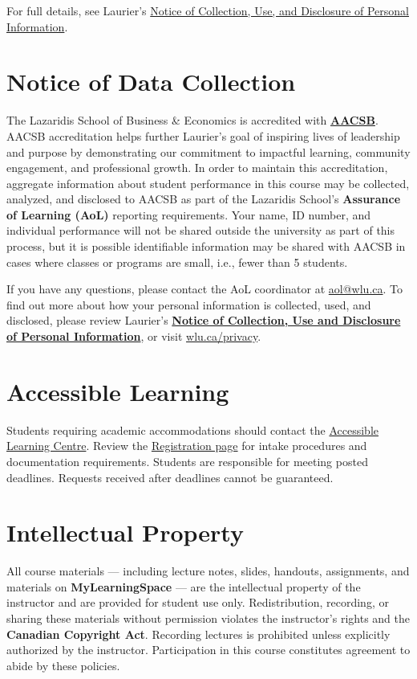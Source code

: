 \documentclass[11pt]{article}
\newcommand{\coloredsection}[1]{%
    \section*{\large\textcolor{sectioncolor}{#1}}%
}
\begin{document}
For full details, see Laurier’s  
\href{https://www.wlu.ca/privacy}{Notice of Collection, Use, and Disclosure of Personal Information}.

\coloredsection{Notice of Data Collection}

The Lazaridis School of Business \& Economics is accredited with 
\href{https://www.aacsb.edu/}{\textbf{AACSB}}. AACSB accreditation helps further Laurier’s goal of inspiring lives of leadership and purpose by demonstrating our commitment to impactful learning, community engagement, and professional growth. In order to maintain this accreditation, aggregate information about student performance in this course may be collected, analyzed, and disclosed to AACSB as part of the Lazaridis School's \textbf{Assurance of Learning (AoL)} reporting requirements. Your name, ID number, and individual performance will not be shared outside the university as part of this process, but it is possible identifiable information may be shared with AACSB in cases where classes or programs are small, i.e., fewer than 5 students.

If you have any questions, please contact the AoL coordinator at \href{mailto:aol@wlu.ca}{aol@wlu.ca}. To find out more about how your personal information is collected, used, and disclosed, please review Laurier’s 
\href{https://www.wlu.ca/about/public-accountability/privacy/notice-of-collection.html}{\textbf{Notice of Collection, Use and Disclosure of Personal Information}}, or visit \href{https://wlu.ca/privacy}{wlu.ca/privacy}.


\coloredsection{Accessible Learning}

Students requiring academic accommodations should contact the  
\href{https://students.wlu.ca/academics/support-and-advising/accessible-learning/index.html}{Accessible Learning Centre}.  
Review the \href{https://students.wlu.ca/academics/support-and-advising/accessible-learning/registration/index.html}{Registration page}  
for intake procedures and documentation requirements.  
Students are responsible for meeting posted deadlines.  
Requests received after deadlines cannot be guaranteed.

\coloredsection{Intellectual Property}

All course materials — including lecture notes, slides, handouts, assignments,  
and materials on \textbf{MyLearningSpace} — are the intellectual property  
of the instructor and are provided for student use only. Redistribution, recording, or sharing these materials without permission  
violates the instructor’s rights and the \textbf{Canadian Copyright Act}.  
Recording lectures is prohibited unless explicitly authorized by the instructor.  
Participation in this course constitutes agreement to abide by these policies.
\end{document}
